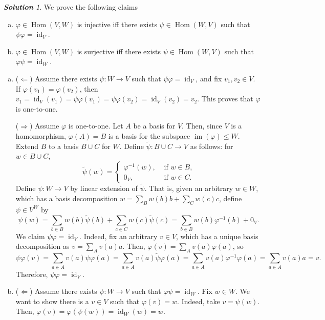 \documentclass[11pt]{paper}
\theoremstyle{remark}
\newtheorem*{solution}{{\bf Solution}}
\newcommand\0{\ensuremath{\mathbf{0}}}
\newcommand{\<}{\ensuremath{\langle}}
\renewcommand{\>}{\ensuremath{\rangle}}
\newcommand\Hom{\ensuremath{\operatorname{Hom}}}
\newcommand{\id}{\ensuremath{\operatorname{id}}}
\newcommand\im[1]{\ensuremath{\operatorname{im}(#1)}}
\renewcommand{\phi}{\ensuremath{\varphi}}
\renewcommand{\leq}{\ensuremath{\leqslant}}
\begin{document}
\begin{solution} We prove the following claims 
  \begin{enumerate}[(a)]
\item
    $\phi\in \Hom(V, W)$ is injective iff 
    there exists $\psi \in \Hom(W, V)$ such that $\psi \phi = \id_V$.
  \item 
    $\phi\in \Hom(V, W)$ is surjective iff 
    there exists $\psi \in \Hom(W, V)$ such that $\phi \psi = \id_W$.
  \end{enumerate}
  \begin{enumerate}[(a)]
  \item ($\Leftarrow$) Assume there exists $\psi: W\rightarrow V$ such that
    $\psi \phi = \id_V$, and fix $v_1, v_2 \in V$. 
    If $\phi(v_1) = \phi(v_2)$, then $v_1 =  \id_V(v_1) = \psi \phi(v_1) =\psi \phi(v_2) =
    \id_V(v_2) =  v_2$. This proves that $\phi$ is one-to-one.

($\Rightarrow$) Assume $\phi$ is one-to-one.  Let $A$ be a basis for
    $V$.  Then, since $V$ is a homomorphism, $\phi(A) = B$ is a basis for the
    subspace $\im \phi \leq W$.  Extend $B$ to a basis $B\cup C$ for $W$.
    Define $\tilde{\psi}: B\cup C \rightarrow V$ as follows: for $w\in B\cup C$,
\[
\tilde\psi (w) =
\begin{cases}
  \phi^{-1}(w), & \text{ if $w \in B$,}\\
0_V, & \text{ if $w \in C$.}
\end{cases}
\]
Define $\psi: W \rightarrow V$ by linear extension of $\tilde \psi$.  That is,
given an arbitrary $w \in W$, which has a basis decomposition 
$w = \sum_B w(b) b +\sum_C w(c) c$, define $\psi \in V^W$ by 
\[
\psi(w) = \sum_{b\in B} w(b) \tilde{\psi}(b) +\sum_{c\in C} w(c)\tilde{\psi}(c)
 = \sum_{b\in B} w(b) \phi^{-1}(b) + 0_V.
\]
We claim $\psi \phi = \id_V$. Indeed, fix an arbitrary $v \in V$, which has
a unique basis decomposition as $v = \sum_A v(a) a$.  Then, $\phi(v)
= \sum_A v(a) \phi(a)$, so 
\[
\psi\phi(v) = 
\sum_{a\in A} v(a)\psi \phi(a) = 
\sum_{a\in A} v(a)\tilde{\psi} \phi(a) =
\sum_{a\in A} v(a)\phi^{-1}\phi(a)=
\sum_{a\in A} v(a)a = v.
\]
Therefore, $\psi \phi = \id_V$.


  \item ($\Leftarrow$) Assume there exists $\psi: W\rightarrow V$ such that
    $\phi \psi = \id_W$.  Fix $w\in W$. We want to show there is a $v\in V$ such
    that $\phi(v) = w$.  Indeed, take $v = \psi(w)$. Then, 
    $\phi(v) = \phi(\psi(w)) = \id_W(w) = w$.


\end{enumerate}
\end{solution}
\end{document}
